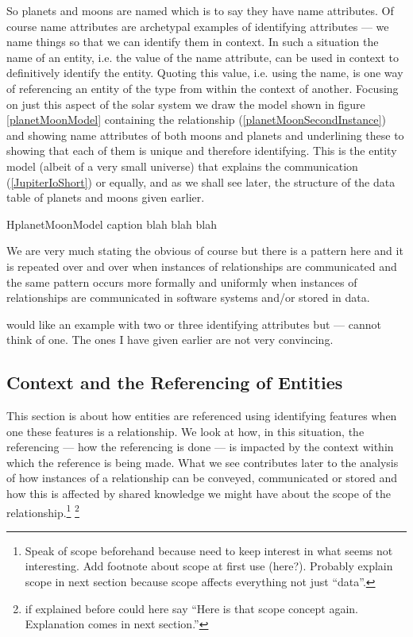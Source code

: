 \mynote So planets and moons are named which is to say they have name attributes.
Of course name attributes are archetypal examples of identifying attributes --- we name things so that we can identify them in context. In such a situation the name of an entity, i.e. the value of the name attribute,  can be used in context to definitively identify the entity.
Quoting this value, i.e. using the name, is one way of referencing an entity of the type from within the context of another.
 \mynote
Focusing on just this aspect of the solar system we  draw the model shown in figure
\ref{planetMoonModel}
containing the relationship (\ref{planetMoonSecondInstance}) and showing name attributes of both moons and planets and
underlining these to showing that each of them is unique and therefore identifying. 
This is the entity model (albeit of a very small universe) that explains the communication (\ref{JupiterIoShort}) or equally, and as we shall see later, the structure of the data table of planets and moons given earlier.
\begin{erboxedFigure} {H}{planetMoonModel}
{
caption blah blah blah
 }

\end{erboxedFigure}
\mynote
We are very much stating the obvious of course but there is a pattern here and it is repeated over and over when instances of relationships are communicated  and the same pattern occurs more formally  and uniformly when instances of relationships are communicated in software systems and/or stored in data.

\begin{noteforfuture}
would like an example with two or three identifying attributes but --- cannot think of one. The ones I have given earlier are not very convincing.
\end{noteforfuture}

\subsection{Context and the Referencing of Entities}
\mynote
This section is about how entities are referenced using identifying features when one these features is a relationship.
We look at how,  in this situation, the referencing 
--- how the referencing is done ---   
is impacted by the context within which the reference is being made. 
What we see contributes 
later to the analysis of how 
instances of a relationship can be conveyed, communicated or stored and
how this is affected by shared knowledge we might have about 
the scope of  the relationship.\footnote{Speak of scope beforehand because need to keep interest in what seems not interesting. Add footnote about scope at first use (here?). Probably explain scope in next section because scope affects everything not just ``data''.} \footnote{if explained before could here say ``Here is that scope concept again. Explanation comes in next section.''}

